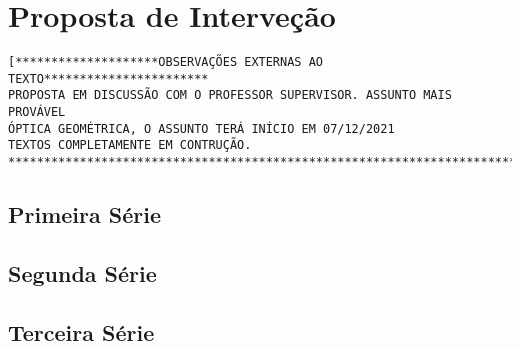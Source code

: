 \chapter{Proposta de Interveção}
\begin{verbatim}
[********************OBSERVAÇÕES EXTERNAS AO TEXTO***********************
PROPOSTA EM DISCUSSÃO COM O PROFESSOR SUPERVISOR. ASSUNTO MAIS PROVÁVEL
ÓPTICA GEOMÉTRICA, O ASSUNTO TERÁ INÍCIO EM 07/12/2021
TEXTOS COMPLETAMENTE EM CONTRUÇÃO.
*************************************************************************]
\end{verbatim}

\section{Primeira Série}
\section{Segunda Série}
\section{Terceira Série}